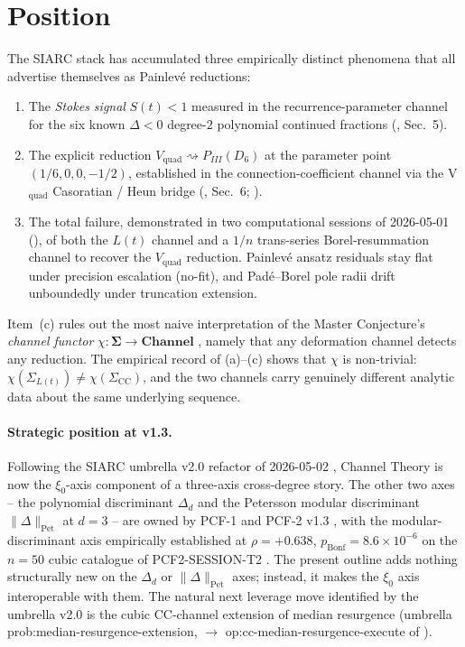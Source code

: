 \documentclass[11pt,reqno]{amsart}
\theoremstyle{plain}
\theoremstyle{definition}
\theoremstyle{remark}
\newcommand{\Channel}{\mathbf{Channel}}
\newcommand{\Sigmaspace}{\mathbf{\Sigma}}
\newcommand{\Lt}{L(t)}
\newcommand{\CC}{\mathrm{CC}}
\newcommand{\Vquad}{V_{\mathrm{quad}}}
\begin{document}
\tableofcontents

\section{Position}
\label{sec:position}

The SIARC stack has accumulated three empirically distinct
phenomena that all advertise themselves as Painlev\'e
reductions:
\begin{enumerate}[label=(\alph*)]
\item The \emph{Stokes signal} $S(t)<1$ measured in the
recurrence-parameter channel for the six known $\Delta<0$
degree-$2$ polynomial continued fractions
(\cite{siarc_pcf1_v13}, Sec.~5).
\item The explicit reduction
$\Vquad \rightsquigarrow P_{III}(D_6)$ at the parameter point
$(1/6, 0, 0, -1/2)$, established in the connection-coefficient
channel via the V$_\mathrm{quad}$ Casoratian / Heun bridge
(\cite{siarc_pcf1_v13}, Sec.~6;
\cite{slavyanov2000special, iwasaki1991from}).
\item The total failure, demonstrated in two computational
sessions of 2026-05-01 (\cite{siarc_painleve_deep_6x,
siarc_borel_5x, siarc_borel_kscan}), of both the $\Lt$ channel
and a $1/n$ trans-series Borel-resummation channel to recover
the $\Vquad$ reduction. Painlev\'e ansatz residuals stay flat
under precision escalation (no-fit), and Pad\'e--Borel pole
radii drift unboundedly under truncation extension.
\end{enumerate}
Item~(c) rules out the most naive interpretation of the
Master Conjecture's \emph{channel functor}
$\chi : \Sigmaspace \to \Channel$ \cite{siarc_umbrella_v2},
namely that any deformation channel detects any reduction.
The empirical record of (a)--(c) shows that $\chi$ is
non-trivial: $\chi(\Sigma_{\Lt}) \ne \chi(\Sigma_{\CC})$,
and the two channels carry genuinely different analytic data
about the same underlying sequence.

\paragraph{Strategic position at v1.3.}
Following the SIARC umbrella v2.0 refactor of 2026-05-02
\cite{siarc_umbrella_v2}, Channel Theory is now the
$\xi_0$-axis component of a three-axis cross-degree story.
The other two axes -- the polynomial discriminant $\Delta_d$
and the Petersson modular discriminant
$\|\Delta\|_{\mathrm{Pet}}$ at $d=3$ -- are owned by PCF-1
\cite{siarc_pcf1_v13} and PCF-2 v1.3
\cite{siarc_pcf2_v13}, with the modular-discriminant axis
empirically established at $\rho = +0.638$,
$p_{\mathrm{Bonf}} = 8.6\times10^{-6}$ on the $n=50$ cubic
catalogue of PCF2-SESSION-T2 \cite{siarc_pcf2_session_t2}.
The present outline adds nothing structurally new on the
$\Delta_d$ or $\|\Delta\|_{\mathrm{Pet}}$ axes; instead, it
makes the $\xi_0$ axis interoperable with them. The natural
next leverage move identified by the umbrella v2.0 is the
cubic CC-channel extension of median resurgence
(umbrella \textsf{prob:median-resurgence-extension},
$\to$ \textsf{op:cc-median-resurgence-execute} of
).
\end{document}
